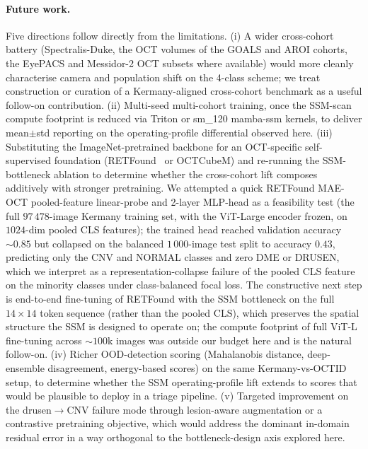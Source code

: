 \documentclass[5p]{elsarticle}
\begin{document}
\paragraph{Future work.}
Five directions follow directly from the limitations.
(i) A wider cross-cohort battery (Spectralis-Duke, the OCT volumes of the GOALS and AROI cohorts, the EyePACS and Messidor-2 OCT subsets where available) would more cleanly characterise camera and population shift on the 4-class scheme; we treat construction or curation of a Kermany-aligned cross-cohort benchmark as a useful follow-on contribution.
(ii) Multi-seed multi-cohort training, once the SSM-scan compute footprint is reduced via Triton or sm\_120 mamba-ssm kernels, to deliver mean$\pm$std reporting on the operating-profile differential observed here.
(iii) Substituting the ImageNet-pretrained backbone for an OCT-specific self-supervised foundation (RETFound~\citep{zhou2023retfound} or OCTCubeM) and re-running the SSM-bottleneck ablation to determine whether the cross-cohort lift composes additively with stronger pretraining. We attempted a quick RETFound MAE-OCT pooled-feature linear-probe and 2-layer MLP-head as a feasibility test (the full $97\,478$-image Kermany training set, with the ViT-Large encoder frozen, on $1024$-dim pooled CLS features); the trained head reached validation accuracy $\sim 0.85$ but collapsed on the balanced $1\,000$-image test split to accuracy $0.43$, predicting only the CNV and NORMAL classes and zero DME or DRUSEN, which we interpret as a representation-collapse failure of the pooled CLS feature on the minority classes under class-balanced focal loss. The constructive next step is end-to-end fine-tuning of RETFound with the SSM bottleneck on the full $14\times 14$ token sequence (rather than the pooled CLS), which preserves the spatial structure the SSM is designed to operate on; the compute footprint of full ViT-L fine-tuning across $\sim 100$k images was outside our budget here and is the natural follow-on.
(iv) Richer OOD-detection scoring (Mahalanobis distance, deep-ensemble disagreement, energy-based scores) on the same Kermany-vs-OCTID setup, to determine whether the SSM operating-profile lift extends to scores that would be plausible to deploy in a triage pipeline.
(v) Targeted improvement on the drusen$\rightarrow$CNV failure mode through lesion-aware augmentation or a contrastive pretraining objective, which would address the dominant in-domain residual error in a way orthogonal to the bottleneck-design axis explored here.


\end{document}
